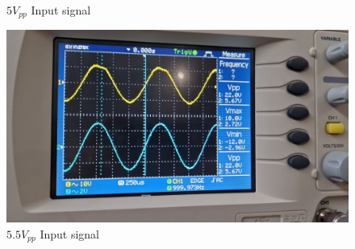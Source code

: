 \begin{figure}[h]
\begin{minipage}{.4\textwidth}
        \caption{$5V_{pp}$ Input signal}
        \label{fig:p3-exp-5}
    \end{minipage}%
    \begin{minipage}{.4\textwidth}
        \includegraphics[width=1\linewidth]{assets/p3-exp-5.5.png}
        \caption{$5.5V_{pp}$ Input signal}
        \label{fig:p3-exp-5.5}
    \end{minipage}
\end{figure}

\newpage
\thispagestyle{plain}

